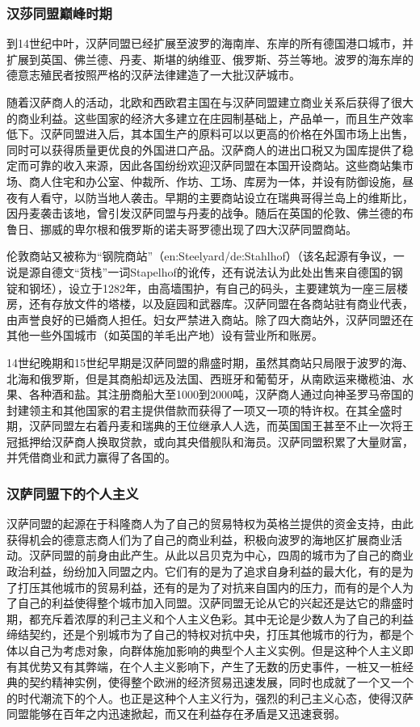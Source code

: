 \subsubsection{汉莎同盟巅峰时期}
到14世纪中叶，汉萨同盟已经扩展至波罗的海南岸、东岸的所有德国港口城市，并扩展到英国、佛兰德、丹麦、斯堪的纳维亚、俄罗斯、芬兰等地。波罗的海东岸的德意志殖民者按照严格的汉萨法律建造了一大批汉萨城市。

随着汉萨商人的活动，北欧和西欧君主国在与汉萨同盟建立商业关系后获得了很大的商业利益。这些国家的经济大多建立在庄园制基础上，产品单一，而且生产效率低下。汉萨同盟进入后，其本国生产的原料可以以更高的价格在外国市场上出售，同时可以获得质量更优良的外国进口产品。汉萨商人的进出口税又为国库提供了稳定而可靠的收入来源，因此各国纷纷欢迎汉萨同盟在本国开设商站。这些商站集市场、商人住宅和办公室、仲裁所、作坊、工场、库房为一体，并设有防御设施，昼夜有人看守，以防当地人袭击。早期的主要商站设立在瑞典哥得兰岛上的维斯比，因丹麦袭击该地，曾引发汉萨同盟与丹麦的战争。随后在英国的伦敦、佛兰德的布鲁日、挪威的卑尔根和俄罗斯的诺夫哥罗德出现了四大汉萨同盟商站。

伦敦商站又被称为“钢院商站”（en:Steelyard/de:Stahlhof）（该名起源有争议，一说是源自德文“货栈”一词Stapelhof的讹传，还有说法认为此处出售来自德国的钢锭和钢坯），设立于1282年，由高墙围护，有自己的码头，主要建筑为一座三层楼房，还有存放文件的塔楼，以及庭园和武器库。汉萨同盟在各商站驻有商业代表，由声誉良好的已婚商人担任。妇女严禁进入商站。除了四大商站外，汉萨同盟还在其他一些外国城市（如英国的羊毛出产地）设有营业所和账房。

14世纪晚期和15世纪早期是汉萨同盟的鼎盛时期，虽然其商站只局限于波罗的海、北海和俄罗斯，但是其商船却远及法国、西班牙和葡萄牙，从南欧运来橄榄油、水果、各种酒和盐。其注册商船大至1000到2000吨，汉萨商人通过向神圣罗马帝国的封建领主和其他国家的君主提供借款而获得了一项又一项的特许权。在其全盛时期，汉萨同盟左右着丹麦和瑞典的王位继承人人选，而英国国王甚至不止一次将王冠抵押给汉萨商人换取贷款，或向其央借舰队和海员。汉萨同盟积累了大量财富，并凭借商业和武力赢得了各国的。
　　
　　
\subsubsection{汉萨同盟下的个人主义}

汉萨同盟的起源在于科隆商人为了自己的贸易特权为英格兰提供的资金支持，由此获得机会的德意志商人们为了自己的商业利益，积极向波罗的海地区扩展商业活动。汉萨同盟的前身由此产生。从此以吕贝克为中心，四周的城市为了自己的商业政治利益，纷纷加入同盟之内。它们有的是为了追求自身利益的最大化，有的是为了打压其他城市的贸易利益，还有的是为了对抗来自国内的压力，而有的是个人为了自己的利益使得整个城市加入同盟。汉萨同盟无论从它的兴起还是达它的鼎盛时期，都充斥着浓厚的利己主义和个人主义色彩。其中无论是少数人为了自己的利益缔结契约，还是个别城市为了自己的特权对抗中央，打压其他城市的行为，都是个体以自己为考虑对象，向群体施加影响的典型个人主义实例。但是这种个人主义即有其优势又有其弊端，在个人主义影响下，产生了无数的历史事件，一桩又一桩经典的契约精神实例，使得整个欧洲的经济贸易迅速发展，同时也成就了一个又一个的时代潮流下的个人。也正是这种个人主义行为，强烈的利己主义心态，使得汉萨同盟能够在百年之内迅速掀起，而又在利益存在矛盾是又迅速衰弱。

